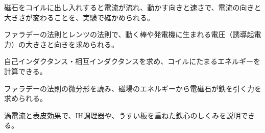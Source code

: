 \begin{furikaeri}
\begin{checklist}
\item 磁石をコイルに出し入れすると電流が流れ、動かす向きと速さで、電流の向きと大きさが変わることを、実験で確かめられる。
\item ファラデーの法則とレンツの法則で、動く棒や発電機に生まれる電圧（誘導起電力）の大きさと向きを求められる。
\item 自己インダクタンス・相互インダクタンスを求め、コイルにたまるエネルギーを計算できる。
\item ファラデーの法則の微分形を読み、磁場のエネルギーから電磁石が鉄を引く力を求められる。
\item 渦電流と表皮効果で、IH調理器や、うすい板を重ねた鉄心のしくみを説明できる。
\end{checklist}
\end{furikaeri}

